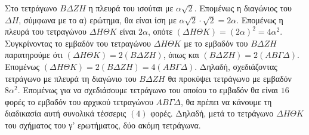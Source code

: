 \begin{alist}
\item
\begin{figure}
\centering
{}
\end{figure}
Στο τετράγωνο $B\Delta ZH$ η πλευρά του ισούται με $\alpha\sqrt{2}$. Επομένως η διαγώνιος του $\Delta H$, σύμφωνα με το α) ερώτημα, θα είναι ίση με $\alpha\sqrt{2}\cdot\sqrt{2} = 2\alpha$. Επομένως η πλευρά του τετραγώνου $\Delta H\Theta K$ είναι $2\alpha$, οπότε $(\Delta H\Theta K) = (2\alpha)^2 = 4\alpha^2$. Συγκρίνοντας το εμβαδόν του τετραγώνου $\Delta H\Theta K$ με το εμβαδόν του $B\Delta ZH$ παρατηρούμε ότι $(\Delta H\Theta K) = 2(B\Delta ZH)$, όπως και $(B\Delta ZH) = 2(AB\Gamma\Delta)$. Επομένως $(\Delta H\Theta K) = 2(B\Delta ZH) = 4(AB\Gamma\Delta)$.
Δηλαδή, σχεδιάζοντας τετράγωνο με πλευρά τη διαγώνιο του $B\Delta ZH$ θα προκύψει τετράγωνο με εμβαδόν $8\alpha^2$.
Επομένως για να σχεδιάσουμε τετράγωνο του οποίου το εμβαδόν θα είναι $16$ φορές το εμβαδόν του αρχικού τετραγώνου $AB\Gamma\Delta$, θα πρέπει να κάνουμε τη διαδικασία αυτή συνολικά τέσσερις $(4)$ φορές. Δηλαδή, μετά το τετράγωνο $\Delta H\Theta K$ του σχήματος του γ' ερωτήματος, δύο ακόμη τετράγωνα.

\end{alist}